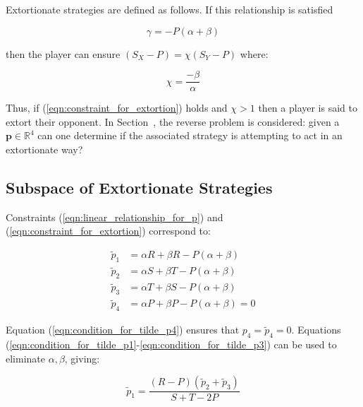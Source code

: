 \documentclass[a4paper]{article}
\begin{document}
Extortionate strategies are defined as follows. If this relationship is
satisfied

\begin{equation}\label{eqn:constraint_for_extortion}
    \gamma = - P(\alpha + \beta)
\end{equation}

then the player can ensure \((S_X - P)=\chi(S_Y-P)\) where:

\begin{equation}\label{eqn:definition_of_chi}
    \chi=\frac{-\beta}{\alpha}
\end{equation}

\noindent Thus, if (\ref{eqn:constraint_for_extortion}) holds and \(\chi >1\) then a player is
said to extort their opponent.
In Section~\label{sec:subspace_of_extortionate_strategies}, the reverse problem is considered: given a
\(\textbf{p}\in\mathbb{R}^4\) can one determine if the associated strategy is attempting
to act in an extortionate way?

\subsection{Subspace of Extortionate Strategies}\label{sec:subspace_of_extortionate_strategies}

Constraints (\ref{eqn:linear_relationship_for_p}) and
(\ref{eqn:constraint_for_extortion}) correspond to:

\begin{align}
    \tilde p_1 & = \alpha R + \beta R - P (\alpha + \beta)
            \label{eqn:condition_for_tilde_p1}\\
    \tilde p_2 & = \alpha S + \beta T - P (\alpha + \beta)
            \label{eqn:condition_for_tilde_p2}\\
    \tilde p_3 & = \alpha T + \beta S - P (\alpha + \beta)
            \label{eqn:condition_for_tilde_p3}\\
    \tilde p_4 & = \alpha P + \beta P - P (\alpha + \beta) = 0
            \label{eqn:condition_for_tilde_p4}
\end{align}

Equation (\ref{eqn:condition_for_tilde_p4}) ensures that \(p_4=\tilde p_4=0\).
Equations (\ref{eqn:condition_for_tilde_p1}-\ref{eqn:condition_for_tilde_p3})
can be used to eliminate \(\alpha, \beta\), giving:

\begin{equation}\label{eqn:planar_definition_of_extortion}
    \tilde p_1 = \frac{(R - P)(\tilde p_2 + \tilde p_3)}{S + T - 2P}
\end{equation}
\end{document}
